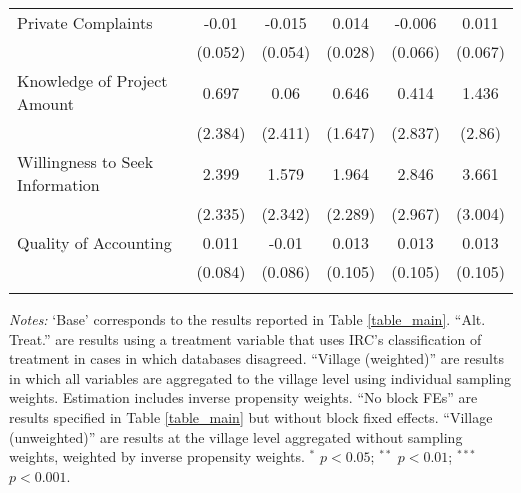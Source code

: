 \begin{tabular}{lc|c|ccc}
 Private Complaints&-0.01&-0.015&0.014&-0.006&0.011 \\  
 &(0.052)&(0.054)&(0.028)&(0.066)&(0.067) \\  
 Knowledge of Project Amount&0.697&0.06&0.646&0.414&1.436 \\  
 &(2.384)&(2.411)&(1.647)&(2.837)&(2.86) \\  
 Willingness to Seek Information&2.399&1.579&1.964&2.846&3.661 \\  
 &(2.335)&(2.342)&(2.289)&(2.967)&(3.004) \\  
 Quality of Accounting&0.011&-0.01&0.013&0.013&0.013 \\  
 &(0.084)&(0.086)&(0.105)&(0.105)&(0.105) \\  
 \hline \hline  
 \label{table_robust}  
 \end{tabular}  
 \begin{flushleft}\textit{Notes:} `Base' corresponds to the results reported in Table \ref{table_main}. 
  ``Alt. Treat.'' are results using a treatment variable that uses IRC's classification of treatment in cases in which databases disagreed. 
  ``Village (weighted)'' are results in which all variables are aggregated to the village level using individual sampling weights. Estimation includes inverse propensity weights. 
  ``No block FEs'' are results specified in Table \ref{table_main} but without block fixed effects. 
  ``Village (unweighted)'' are results at the village level aggregated without sampling weights, weighted by inverse propensity weights. $^*$ $p<0.05$; $^{**}$ $p<0.01$; $^{***}$ $p<0.001$.\end{flushleft}  
